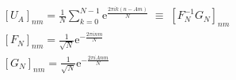 \documentclass{article}
\begin{document}
\[
\begin{gathered}
[U_A]_{nm}
  = \frac{1}{N}
    \sum_{k=0}^{N-1}
    \mathrm{e}^{\frac{2\pi i k (n - A m)}{N}}
    \;\equiv\;
    [F_N^{-1}G_N]_{nm} \\[1em]
[F_N]_{nm}
  = \frac{1}{\sqrt{N}}
    \mathrm{e}^{-\frac{2\pi i n m}{N}} \\[1em]
[G_N]_{nm}
  = \frac{1}{\sqrt{N}}
    \mathrm{e}^{-\frac{2\pi i A n m}{N}} \\[1em]
\end{gathered}
\]
\end{document}
